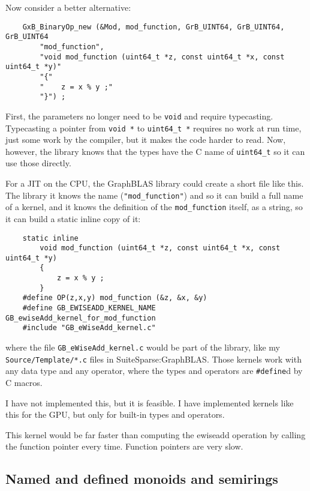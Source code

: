 \documentclass[12pt]{article}
\begin{document}
Now consider a better alternative:

{\footnotesize
\begin{verbatim}
    GxB_BinaryOp_new (&Mod, mod_function, GrB_UINT64, GrB_UINT64, GrB_UINT64
        "mod_function",
        "void mod_function (uint64_t *z, const uint64_t *x, const uint64_t *y)"
        "{"
        "    z = x % y ;"
        "}") ;
\end{verbatim}}

First, the parameters no longer need to be \verb'void' and require typecasting.
Typecasting a pointer from \verb'void *' to \verb'uint64_t *' requires no work
at run time, just some work by the compiler, but it makes the code harder to
read.  Now, however, the library knows that the types have the C name of
\verb"uint64_t" so it can use those directly.

For a JIT on the CPU, the GraphBLAS library could create a short
file like this.  The library it knows the name (\verb'"mod_function"')
and so it can build a full name of a kernel, and it knows the definition
of the \verb'mod_function' itself, as a string, so it can build a
static inline copy of it:

{\footnotesize
\begin{verbatim}
    static inline
        void mod_function (uint64_t *z, const uint64_t *x, const uint64_t *y)
        {
            z = x % y ;
        }
    #define OP(z,x,y) mod_function (&z, &x, &y)
    #define GB_EWISEADD_KERNEL_NAME GB_ewiseAdd_kernel_for_mod_function
    #include "GB_eWiseAdd_kernel.c"
\end{verbatim}}

where the file \verb'GB_eWiseAdd_kernel.c' would be part of the library,
like my \verb'Source/Template/*.c' files in SuiteSparse:GraphBLAS.  Those
kernels work with any data type and any operator, where the types and operators
are \verb'#define'd by C macros.

I have not implemented this, but it is feasible.  I have implemented
kernels like this for the GPU, but only for built-in types and operators.

This kernel would be far faster than computing the ewiseadd operation
by calling the function pointer every time.  Function pointers are very slow.

\subsection{Named and defined monoids and semirings}
\end{document}
